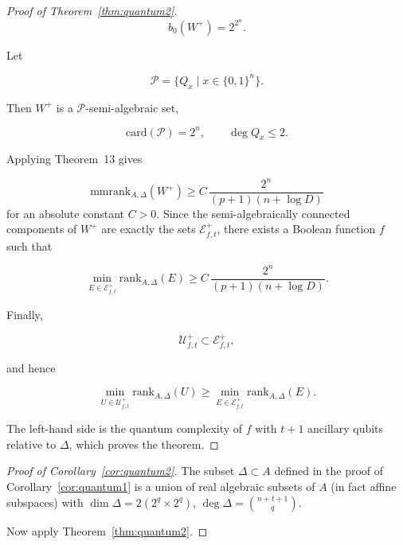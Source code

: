 \documentclass[10pt]{amsart}
\theoremstyle{definition}
\theoremstyle{remark}
\numberwithin{equation}{section}
\newcommand{\card}{\mathrm{card}}
\newcommand{\rank}{\mathrm{rank}}
\newcommand{\mmrank}{\mathrm{mmrank}}
\begin{document}
\begin{proof}[Proof of Theorem~\ref{thm:quantum2}]
$$
b_0(W^{+})=2^{2^{n}}.
$$

Let

$$
\mathcal P=\{Q_x\mid x\in\{0,1\}^{n}\}.
$$

Then \(W^{+}\) is a \(\mathcal P\)-semi-algebraic set,

$$
\card(\mathcal P)=2^{n},
\qquad
\deg Q_x\leq2.
$$

Applying Theorem~13 gives

$$
\mmrank_{A,\Delta}(W^{+})
\geq
C\,
\frac{2^{n}}
     {(p+1)(n+\log D)}
$$
for an absolute constant \(C>0\).
Since the semi-algebraically connected components of \(W^{+}\) are exactly
the sets \(\mathcal E^{+}_{f,t}\), there exists a Boolean function \(f\)
such that

$$
\min_{E\in\mathcal E^{+}_{f,t}}
\rank_{A,\Delta}(E)
\geq
C\,
\frac{2^{n}}
     {(p+1)(n+\log D)}.
$$

Finally,

$$
\mathcal U^{+}_{f,t}\subset\mathcal E^{+}_{f,t},
$$

and hence

$$
\min_{U\in\mathcal U^{+}_{f,t}}
\rank_{A,\Delta}(U)
\geq
\min_{E\in\mathcal E^{+}_{f,t}}
\rank_{A,\Delta}(E).
$$

The left-hand side is the quantum complexity of \(f\) with \(t+1\)
ancillary qubits relative to \(\Delta\), which proves the theorem.
\end{proof}

\begin{proof}[Proof of Corollary~\ref{cor:quantum2}]
    The subset $\Delta \subset A$ defined in the proof of
    Corollary~\ref{cor:quantum1} is a union of real algebraic subsets of 
    $A$
    (in fact affine subspaces) with $\dim \Delta =   2(2^q \times 2^q)$,
    $\deg \Delta = \binom{n+t+1}{q}$.

    Now apply Theorem~\ref{thm:quantum2}.
\end{proof}
\end{document}
